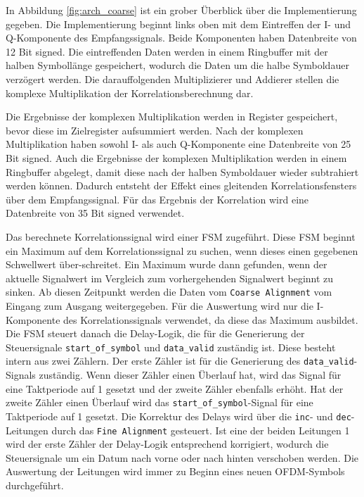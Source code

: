 In Abbildung \ref{fig:arch_coarse} ist ein grober Überblick über die Implementierung gegeben. Die Implementierung beginnt links oben mit dem Eintreffen der I- und Q-Komponente des Empfangssignals. Beide Komponenten haben Datenbreite von 12 Bit signed. Die eintreffenden Daten werden in einem Ringbuffer mit der halben Symbollänge gespeichert, wodurch die Daten um die halbe Symboldauer verzögert werden. Die darauffolgenden Multiplizierer und Addierer stellen die komplexe Multiplikation der Korrelationsberechnung dar.

\begin{center}
\end{center}

Die Ergebnisse der komplexen Multiplikation werden in Register gespeichert, bevor diese im Zielregister aufsummiert werden. Nach der komplexen Multiplikation haben sowohl I- als auch Q-Komponente eine Datenbreite von 25 Bit signed. Auch die Ergebnisse der komplexen Multiplikation werden in einem Ringbuffer abgelegt, damit diese nach der halben Symboldauer wieder subtrahiert werden können. Dadurch entsteht der Effekt eines gleitenden Korrelationsfensters über dem Empfangssignal. Für das Ergebnis der Korrelation wird eine Datenbreite von 35 Bit signed verwendet. \vspace{0.5 cm}

Das berechnete Korrelationssignal wird einer FSM zugeführt. Diese FSM beginnt ein Maximum auf dem Korrelationssignal zu suchen, wenn dieses einen gegebenen Schwellwert über-schreitet. Ein Maximum wurde dann gefunden, wenn der aktuelle Signalwert im Vergleich zum vorhergehenden Signalwert beginnt zu sinken. Ab diesen Zeitpunkt werden die Daten vom \texttt{Coarse Alignment} vom Eingang zum Ausgang weitergegeben. Für die Auswertung wird nur die I-Komponente des Korrelationssignals verwendet, da diese das Maximum ausbildet. Die FSM steuert danach die Delay-Logik, die für die Generierung der Steuersignale \texttt{start\_of\_symbol} und \texttt{data\_valid} zuständig ist. Diese besteht intern aus zwei Zählern. Der erste Zähler ist für die Generierung des \texttt{data\_valid}-Signals zuständig. Wenn dieser Zähler einen Überlauf hat, wird das Signal für eine Taktperiode auf 1 gesetzt und der zweite Zähler ebenfalls erhöht. Hat der zweite Zähler einen Überlauf wird das \texttt{start\_of\_symbol}-Signal für eine Taktperiode auf 1 gesetzt. Die Korrektur des Delays wird über die \texttt{inc}- und \texttt{dec}-Leitungen durch das \texttt{Fine Alignment} gesteuert. Ist eine der beiden Leitungen 1 wird der erste Zähler der Delay-Logik entsprechend korrigiert, wodurch die Steuersignale um ein Datum nach vorne oder nach hinten verschoben werden. Die Auswertung der Leitungen wird immer zu Beginn eines neuen OFDM-Symbols durchgeführt.

